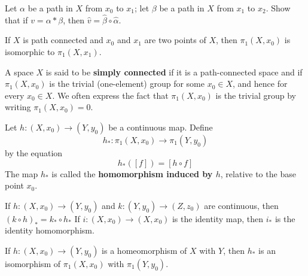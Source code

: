 \documentclass[12pt, a4paper, oneside]{book}
\begin{document}
\begin{proposition}
    Let $\alpha$ be a path in $X$ from $x_0$ to $x_1$; let $\beta$ be a path in $X$ from $x_1$ to $x_2$. Show that if $v=\alpha * \beta$, then $\hat{v}=\hat{\beta} \circ \hat{\alpha}$.
\end{proposition}


\begin{corollary}
    If $X$ is path connected and $x_0$ and $x_1$ are two points of $X$, then $\pi_1\left(X, x_0\right)$ is isomorphic to $\pi_1\left(X, x_1\right)$.
\end{corollary}


\begin{definition}
    A space $X$ is said to be \textbf{simply connected} if it is a path-connected space and if $\pi_1\left(X, x_0\right)$ is the trivial (one-element) group for some $x_0 \in X$, and hence for every $x_0 \in X$. We often express the fact that $\pi_1\left(X, x_0\right)$ is the trivial group by writing $\pi_1\left(X, x_0\right)=0$.
\end{definition}

\begin{definition}
    Let $h : \left(X, x_0\right) \rightarrow\left(Y, y_0\right)$ be a continuous map. Define
    \begin{equation*}
        h_* :\pi_1\left(X, x_0\right) \longrightarrow \pi_1\left(Y, y_0\right)
    \end{equation*}
    by the equation
    \begin{equation*}
        h_*([f])=[h \circ f]
    \end{equation*}
    The map $h_*$ is called the \textbf{homomorphism induced by $h$}, relative to the base point $x_0$.
\end{definition}

\begin{theorem}
    If $h:\left(X, x_0\right) \rightarrow\left(Y, y_0\right)$ and $k:\left(Y, y_0\right) \rightarrow\left(Z, z_0\right)$ are continuous, then $(k \circ h)_*=k_* \circ h_*$ If $i:\left(X, x_0\right) \rightarrow\left(X, x_0\right)$ is the identity map, then $i_*$ is the identity homomorphism.
\end{theorem}

\begin{corollary}
    If $h:\left(X, x_0\right) \rightarrow\left(Y, y_0\right)$ is a homeomorphism of $X$ with $Y$, then $h_*$ is an isomorphism of $\pi_1\left(X, x_0\right)$ with $\pi_1\left(Y, y_0\right)$.
\end{corollary}
\end{document}
